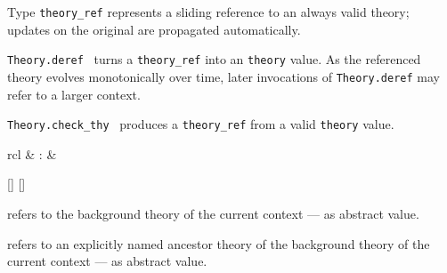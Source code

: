 \begin{isabellebody}
\begin{isamarkuptext}
\begin{description}
  \item Type \verb|theory_ref| represents a sliding reference to
  an always valid theory; updates on the original are propagated
  automatically.

  \item \verb|Theory.deref|~ turns a \verb|theory_ref| into an \verb|theory| value.  As the referenced
  theory evolves monotonically over time, later invocations of \verb|Theory.deref| may refer to a larger context.

  \item \verb|Theory.check_thy|~ produces a \verb|theory_ref| from a valid \verb|theory| value.

  \end{description}%
\end{isamarkuptext}%
\isamarkuptrue%
%
\endisatagmlref
{\isafoldmlref}%
%
\isadelimmlref
%
\endisadelimmlref
%
\isadelimmlantiq
%
\endisadelimmlantiq
%
\isatagmlantiq
%
\begin{isamarkuptext}%
\begin{matharray}{rcl}
  \hypertarget{ML antiquotation.theory}{\hyperlink{ML antiquotation.theory}{\mbox{}}} & : &  \\
  \end{matharray}

  \begin{railoutput}
[]
\rail@bar
{}
[]
\rail@endbar
\rail@end
\end{railoutput}


  \begin{description}

  \item {} refers to the background theory of the
  current context --- as abstract value.

  \item {} refers to an explicitly named ancestor
  theory  of the background theory of the current context
  --- as abstract value.


\end{description}
\end{isamarkuptext}
\end{isabellebody}

